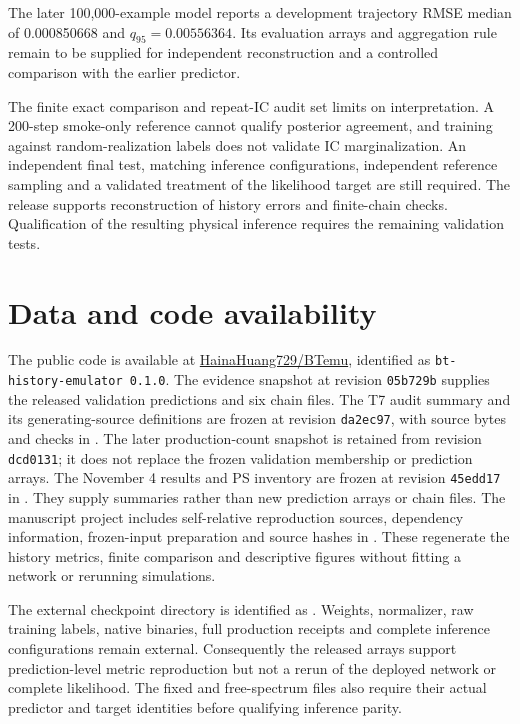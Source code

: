 The later 100,000-example model reports a development trajectory RMSE median of 0.000850668 and $q_{95}=0.00556364$. Its evaluation arrays and aggregation rule remain to be supplied for independent reconstruction and a controlled comparison with the earlier predictor.

The finite exact comparison and repeat-IC audit set limits on interpretation. A 200-step smoke-only reference cannot qualify posterior agreement, and training against random-realization labels does not validate IC marginalization. An independent final test, matching inference configurations, independent reference sampling and a validated treatment of the likelihood target are still required. The release supports reconstruction of history errors and finite-chain checks. Qualification of the resulting physical inference requires the remaining validation tests.


\section*{Data and code availability}

The public code is available at \href{https://github.com/HainaHuang729/BTemu}{HainaHuang729/BTemu}, identified as \texttt{bt-history-emulator 0.1.0}. The evidence snapshot at revision \texttt{05b729b} supplies the released validation predictions and six chain files. The T7 audit summary and its generating-source definitions are frozen at revision \texttt{da2ec97}, with source bytes and checks in . The later production-count snapshot is retained from revision \texttt{dcd0131}; it does not replace the frozen validation membership or prediction arrays. The November 4 results and PS inventory are frozen at revision \texttt{45edd17} in . They supply summaries rather than new prediction arrays or chain files. The manuscript project includes self-relative reproduction sources, dependency information, frozen-input preparation and source hashes in . These regenerate the history metrics, finite comparison and descriptive figures without fitting a network or rerunning simulations.

The external checkpoint directory is identified as . Weights, normalizer, raw training labels, native binaries, full production receipts and complete inference configurations remain external. Consequently the released arrays support prediction-level metric reproduction but not a rerun of the deployed network or complete likelihood. The fixed and free-spectrum files also require their actual predictor and target identities before qualifying inference parity.

